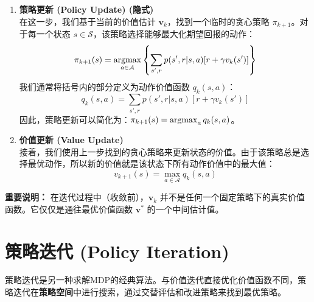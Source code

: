 \documentclass[12pt, a4paper]{article}
\newcommand{\argmax}{\operatornamewithlimits{argmax}} %
\newcommand{\vect}[1]{\mathbf{#1}} %
\begin{document}
\begin{enumerate}[label=\textbf{Step \arabic*}:, wide, labelwidth=!, labelindent=0pt]
    \item \textbf{策略更新 (Policy Update) (隐式)} \\
    在这一步，我们基于当前的价值估计 $\vect{v}_k$，找到一个临时的贪心策略 $\pi_{k+1}$。对于每一个状态 $s \in \mathcal{S}$，该策略选择能够最大化期望回报的动作：
    \[
    \pi_{k+1}(s) = \argmax_{a \in \mathcal{A}} \left\{ \sum_{s', r} p(s', r | s, a) [r + \gamma v_k(s')] \right\}
    \]
    我们通常将括号内的部分定义为动作价值函数 $q_k(s, a)$：
    \[
    q_k(s, a) = \sum_{s', r} p(s', r | s, a) [r + \gamma v_k(s')]
    \]
    因此，策略更新可以简化为：$\pi_{k+1}(s) = \argmax_{a} q_k(s, a)$。

    \item \textbf{价值更新 (Value Update)} \\
    接着，我们使用上一步找到的贪心策略来更新状态的价值。由于该策略总是选择最优动作，所以新的价值就是该状态下所有动作价值中的最大值：
    \[
    v_{k+1}(s) = \max_{a \in \mathcal{A}} q_k(s, a)
    \]
\end{enumerate}

\textbf{重要说明：} 在迭代过程中（收敛前），$\vect{v}_k$ 并不是任何一个固定策略下的真实价值函数。它仅仅是通往最优价值函数 $\vect{v}^*$ 的一个中间估计值。


\section{策略迭代 (Policy Iteration)}
策略迭代是另一种求解MDP的经典算法。与价值迭代直接优化价值函数不同，策略迭代在\textbf{策略空间}中进行搜索，通过交替评估和改进策略来找到最优策略。
\end{document}
